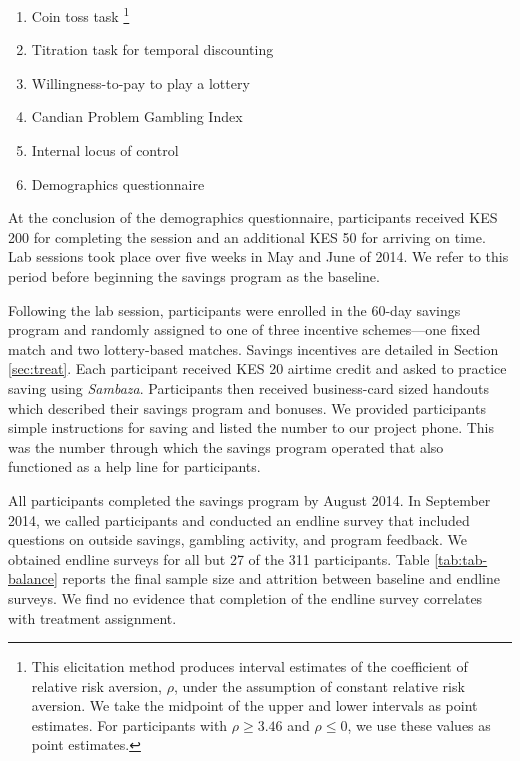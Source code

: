 \documentclass[11pt]{article}
\begin{document}
		\begin{enumerate} \setlength{\itemsep}{1pt}
		\item Coin toss task \footnote{This elicitation method produces interval estimates of the coefficient of relative risk aversion, $\rho$, under the assumption of constant relative risk aversion. We take the midpoint of the upper and lower intervals as point estimates. For participants with $\rho \geq 3.46$ and $\rho \leq 0$, we use these values as point estimates.}
		\item Titration task for temporal discounting 
		\item Willingness-to-pay to play a lottery
		\item Candian Problem Gambling Index 
		\item Internal locus of control 
		\item Demographics questionnaire
		\end{enumerate}


		At the conclusion of the demographics questionnaire, participants received KES 200 for completing the session and an additional KES 50 for arriving on time. Lab sessions took place over five weeks in May and June of 2014. We refer to this period before beginning the savings program as the baseline.

		Following the lab session, participants were enrolled in the 60-day savings program and randomly assigned to one of three incentive schemes---one fixed match and two lottery-based matches. Savings incentives are detailed in Section \ref{sec:treat}. Each participant received KES 20 airtime credit and asked to practice saving using \textit{Sambaza}. Participants then received business-card sized handouts which described their savings program and bonuses. We provided participants simple instructions for saving and listed the number to our project phone. This was the number through which the savings program operated that also functioned as a help line for participants.


		All participants completed the savings program by August 2014. In September 2014, we called participants and conducted an endline survey that included questions on outside savings, gambling activity, and program feedback. We obtained endline surveys for all but 27 of the 311 participants. Table \ref{tab:tab-balance} reports the final sample size and attrition between baseline and endline surveys. We find no evidence that completion of the endline survey correlates with treatment assignment.
\end{document}
